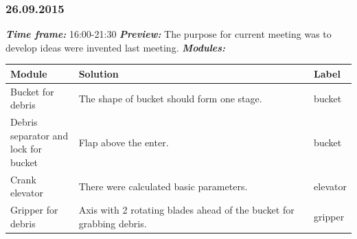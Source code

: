 \subsubsection{26.09.2015}
	\textit{\textbf{Time frame:}} 16:00-21:30 \newline
	\textit{\textbf{Preview:}} The purpose for current meeting was to develop ideas were invented last meeting.\newline \newline
	\textit{\textbf{Modules:}}

  \begin{table}[H]
	\vspace{-2mm}
	\begin{center}
		\begin{tabular}{|p{0.2\linewidth}|p{0.7\linewidth}|p{0.1\linewidth}|}
			\hline
			Module & Solution & Label \\
			\hline
			Bucket for debris & The shape of bucket should form one stage. & bucket \\
			\hline
			Debris separator and lock for bucket & Flap above the enter. & bucket \\
			\hline
			Crank elevator & There were calculated basic parameters. & elevator \\
			\hline
			Gripper for debris & Axis with 2 rotating blades ahead of the bucket for grabbing debris. & gripper \\
			\hline
		\end{tabular}
	\end{center}
  \end{table}
  
